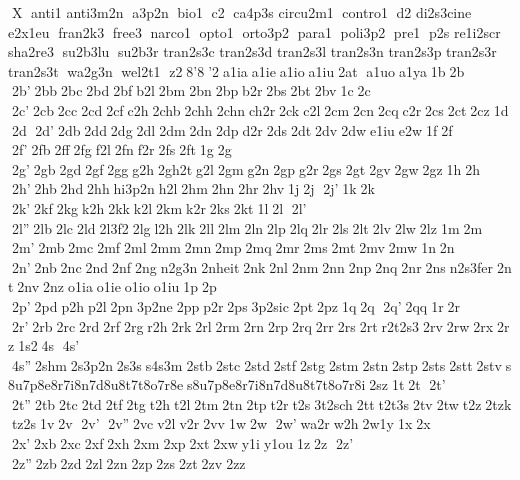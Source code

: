X  anti1 	 anti3m2n  a3p2n  bio1  c2  ca4p3s 	 circu2m1  contro1  d2 
 di2s3cine  e2x1eu  fran2k3  free3  narco1  opto1  orto3p2  para1  poli3p2  pre1  p2s 	 re1i2scr  sha2re3  su2b3lu  su2b3r 	 tran2s3c 	 tran2s3d 	 tran2s3l 	 tran2s3n 	 tran2s3p 	 tran2s3r 	 tran2s3t  wa2g3n  wel2t1  z2 8'8 '2 a1ia a1ie a1io a1iu 2at  a1uo a1ya 1b 2b  2b' 2bb 2bc 2bd 2bf b2l 2bm 2bn 2bp b2r 2bs 2bt 2bv 1c 2c  2c' 2cb 2cc 2cd 2cf c2h 2chb 2chh 2chn ch2r 2ck c2l 2cm 2cn 2cq c2r 2cs 2ct 2cz 1d 2d  2d' 2db 2dd 2dg 2dl 2dm 2dn 2dp d2r 2ds 2dt 2dv 2dw e1iu e2w 1f 2f  2f' 2fb 2ff 2fg f2l 2fn f2r 2fs 2ft 1g 2g  2g' 2gb 2gd 2gf 2gg g2h 2gh2t g2l 2gm g2n 2gp g2r 2gs 2gt 2gv 2gw 2gz 1h 2h  2h' 2hb 2hd 2hh hi3p2n h2l 2hm 2hn 2hr 2hv 1j 2j  2j' 1k 2k  2k' 2kf 2kg k2h 2kk k2l 2km k2r 2ks 2kt 1l 2l  2l'  2l'' 2lb 2lc 2ld 2l3f2 2lg l2h 2lk 2ll 2lm 2ln 2lp 2lq 2lr 2ls 2lt 2lv 2lw 2lz 1m 2m  2m' 2mb 2mc 2mf 2ml 2mm 2mn 2mp 2mq 2mr 2ms 2mt 2mv 2mw 1n 2n  2n' 2nb 2nc 2nd 2nf 2ng n2g3n 2nheit 2nk 2nl 2nm 2nn 2np 2nq 2nr 2ns n2s3fer 2nt 2nv 2nz o1ia o1ie o1io o1iu 1p 2p  2p' 2pd p2h p2l 2pn 3p2ne 2pp p2r 2ps 3p2sic 2pt 2pz 1q 2q  2q' 2qq 1r 2r  2r' 2rb 2rc 2rd 2rf 2rg r2h 2rk 2rl 2rm 2rn 2rp 2rq 2rr 2rs 2rt r2t2s3 2rv 2rw 2rx 2rz 1s2 4s  4s'  4s'' 2shm 2s3p2n 2s3s s4s3m 2stb 2stc 2std 2stf 2stg 2stm 2stn 2stp 2sts 2stt 2stv s8u7p8e8r7i8n7d8u8t7t8o7r8e s8u7p8e8r7i8n7d8u8t7t8o7r8i 2sz 1t 2t  2t'  2t'' 2tb 2tc 2td 2tf 2tg t2h t2l 2tm 2tn 2tp t2r t2s 3t2sch 2tt t2t3s 2tv 2tw t2z 2tzk tz2s 1v 2v  2v'  2v'' 2vc v2l v2r 2vv 1w 2w  2w' wa2r w2h 2w1y 1x 2x  2x' 2xb 2xc 2xf 2xh 2xm 2xp 2xt 2xw y1i y1ou 1z 2z  2z'  2z'' 2zb 2zd 2zl 2zn 2zp 2zs 2zt 2zv 2zz